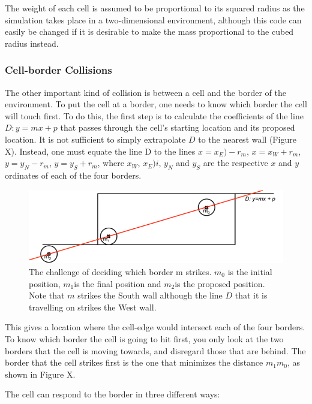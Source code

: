 \documentclass[12pt]{article}
\begin{document}
The weight of each cell is assumed to be proportional to its squared radius 
as the simulation takes place in a two-dimensional environment, although 
this code can easily be changed if it is desirable to make the mass 
proportional to the cubed radius instead.

\subsubsection{Cell-border Collisions}
The other important kind of collision is between a cell and the border 
of the environment. To put the cell at a border, one needs to know which 
border the cell will touch first. To do this, the first step is to 
calculate the coefficients of the line \(D: y=mx + p\) that passes through 
the cell's starting location and its proposed location. It is not 
sufficient to simply extrapolate \(D\) to the nearest wall (Figure X). 
Instead, one must equate the line D to the lines 
\(x = x_E) - r_m\), \(x = x_W + r_m\), \(y = y_N - r_m\), \(y = y_S + r_m\), 
where \(x_W\), \(x_E)i\), \(y_N\) and \(y_S\) are the respective \(x\) 
and \(y\) ordinates of each of the four borders.

\begin{figure}[H]
\centering
\includegraphics[width=12.98cm]{media/wall.png}
\caption{The challenge of deciding which border m 
  strikes. \(m_0\) is the initial position, \(m_1\)is the final 
  position and \(m_2\)is the proposed position. Note that \(m\) strikes 
  the South wall although the line \(D\) that it is travelling on strikes the 
West wall.}
\end{figure}

This gives a location where the cell-edge would intersect each of the
four borders. To know which border the cell is going to hit 
first, you only look at the two borders that the cell is moving towards, 
and disregard those that are behind. The border that the cell strikes 
first is the one that minimizes the distance \(m_1m_0\), as 
shown in Figure X. 

The cell can respond to the border in three different ways: 
\end{document}
